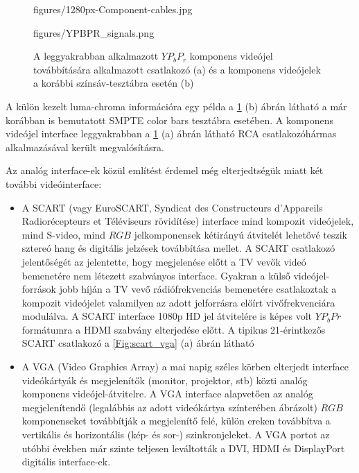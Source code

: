 \begin{figure}[]
	\centering
	\begin{overpic}[width = 0.45\columnwidth ]{figures/1280px-Component-cables.jpg}
	\end{overpic} \hfill
	\begin{overpic}[width = 0.45\columnwidth ]{figures/YPBPR_signals.png}
	\end{overpic} \hfill
	\caption{A leggyakrabban alkalmazott $YP_bP_r$ komponens videójel továbbítására alkalmazott csatlakozó (a) és a komponens videójelek a korábbi színsáv-tesztábra esetén (b)}
	\label{Fig:comp_video}
\end{figure}
A külön kezelt luma-chroma információra egy példa a \ref{Fig:comp_video} (b) ábrán látható a már korábban is bemutatott SMPTE color bars tesztábra esetében.
A komponens videójel interface leggyakrabban a \ref{Fig:comp_video} (a) ábrán látható RCA csatlakozóhármas alkalmazásával került megvalósításra.

\hspace{3mm}
Az analóg interface-ek közül említést érdemel még elterjedtségük miatt két további videóinterface:
\begin{itemize}
\item A SCART (vagy EuroSCART, Syndicat des Constructeurs d'Appareils Radiorécepteurs et Téléviseurs rövidítése) interface mind kompozit videójelek, mind S-video, mind $RGB$ jelkomponensek kétirányú átvitelét lehetővé teszik sztereó hang és digitális jelzések továbbítása mellet.
A SCART csatlakozó jelentőségét az jelentette, hogy megjelenése előtt a TV vevők videó bemenetére nem létezett szabványos interface.
Gyakran a külső videójel-források jobb híján a TV vevő rádiófrekvenciás bemenetére csatlakoztak a kompozit videójelet valamilyen az adott jelforrásra előírt vivőfrekvenciára modulálva.
A SCART interface 1080p HD jel átvitelére is képes volt $YP_bPr$ formátumra a HDMI szabvány elterjedése előtt.
A tipikus 21-érintkezős SCART csatlakozó a \ref{Fig:scart_vga} (a) ábrán látható
\item A VGA (Video Graphics Array) a mai napig széles körben elterjedt interface videókártyák és megjelenítők (monitor, projektor, stb) közti analóg komponens videójel-átvitelre.
A VGA interface alapvetően az analóg megjelenítendő (legalábbis az adott videókártya színterében ábrázolt) $RGB$ komponenseket továbbítják a megjelenítő felé, külön ereken továbbítva a vertikális és horizontális (kép- és sor-) szinkronjeleket.
A VGA portot az utóbbi években már szinte teljesen leváltották a DVI, HDMI és DisplayPort digitális interface-ek.
\end{itemize}

